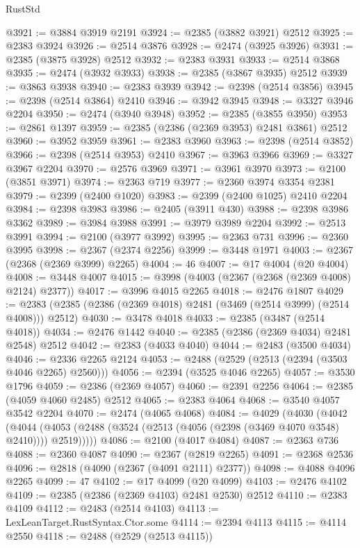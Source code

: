 \begin{lexlean}{RustStd}
\begin{coremodule}
@3921 := @3884 @3919 @2191
@3924 := @2385 (@3882 @3921) @2512
@3925 := @2383 @3924
@3926 := @2514 @3876
@3928 := @2474 (@3925 @3926)
@3931 := @2385 (@3875 @3928) @2512
@3932 := @2383 @3931
@3933 := @2514 @3868
@3935 := @2474 (@3932 @3933)
@3938 := @2385 (@3867 @3935) @2512
@3939 := @3863 @3938
@3940 := @2383 @3939
@3942 := @2398 (@2514 @3856)
@3945 := @2398 (@2514 @3864) @2410
@3946 := @3942 @3945
@3948 := @3327 @3946 @2204
@3950 := @2474 (@3940 @3948)
@3952 := @2385 (@3855 @3950)
@3953 := @2861 @1397
@3959 := @2385 (@2386 (@2369 @3953) @2481 @3861) @2512
@3960 := @3952 @3959
@3961 := @2383 @3960
@3963 := @2398 (@2514 @3852)
@3966 := @2398 (@2514 @3953) @2410
@3967 := @3963 @3966
@3969 := @3327 @3967 @2204
@3970 := @2576 @3969
@3971 := @3961 @3970
@3973 := @2100 (@3851 @3971)
@3974 := @2363 @719
@3977 := @2360 @3974 @3354 @2381
@3979 := @2399 (@2400 @1020)
@3983 := @2399 (@2400 @1025) @2410 @2204
@3984 := @2398 @3983
@3986 := @2405 (@3911 @430)
@3988 := @2398 @3986 @3362
@3989 := @3984 @3988
@3991 := @3979 @3989 @2204
@3992 := @2513 @3991
@3994 := @2100 (@3977 @3992)
@3995 := @2363 @731
@3996 := @2360 @3995
@3998 := @2367 (@2374 @2256)
@3999 := @3448 @1971
@4003 := @2367 (@2368 (@2369 @3999) @2265)
@4004 := 46
@4007 := @17 @4004 (@20 @4004)
@4008 := @3448 @4007
@4015 := @3998 (@4003 (@2367 (@2368 (@2369 @4008) @2124) @2377))
@4017 := @3996 @4015 @2265
@4018 := @2476 @1807
@4029 := @2383 (@2385 (@2386 (@2369 @4018) @2481 (@3469 (@2514 @3999) (@2514 @4008))) @2512)
@4030 := @3478 @4018
@4033 := @2385 (@3487 (@2514 @4018))
@4034 := @2476 @1442
@4040 := @2385 (@2386 (@2369 @4034) @2481 @2548) @2512
@4042 := @2383 (@4033 @4040)
@4044 := @2483 (@3500 @4034)
@4046 := @2336 @2265 @2124
@4053 := @2488 (@2529 (@2513 (@2394 (@3503 @4046 @2265) @2560)))
@4056 := @2394 (@3525 @4046 @2265)
@4057 := @3530 @1796
@4059 := @2386 (@2369 @4057)
@4060 := @2391 @2256
@4064 := @2385 (@4059 @4060 @2485) @2512
@4065 := @2383 @4064
@4068 := @3540 @4057 @3542 @2204
@4070 := @2474 (@4065 @4068)
@4084 := @4029
    (@4030
      (@4042
        (@4044 (@4053 (@2488 (@3524 (@2513 (@4056 (@2398 (@3469 @4070 @3548) @2410)))) @2519)))))
@4086 := @2100 (@4017 @4084)
@4087 := @2363 @736
@4088 := @2360 @4087
@4090 := @2367 (@2819 @2265)
@4091 := @2368 @2536
@4096 := @2818 (@4090 (@2367 (@4091 @2111) @2377))
@4098 := @4088 @4096 @2265
@4099 := 47
@4102 := @17 @4099 (@20 @4099)
@4103 := @2476 @4102
@4109 := @2385 (@2386 (@2369 @4103) @2481 @2530) @2512
@4110 := @2383 @4109
@4112 := @2483 (@2514 @4103)
@4113 := LexLeanTarget.RustSyntax.Ctor.some
@4114 := @2394 @4113
@4115 := @4114 @2550
@4118 := @2488 (@2529 (@2513 @4115))

\end{coremodule}
\end{lexlean}
